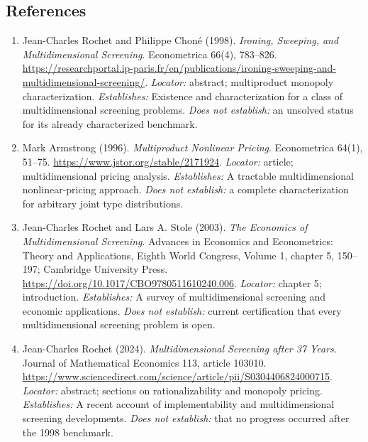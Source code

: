\documentclass[11pt,a4paper]{article}
\begin{document}
\subsection*{References}

\begin{enumerate}

\item[S1] Jean-Charles Rochet and Philippe Choné (1998). \emph{Ironing, Sweeping, and Multidimensional Screening}. Econometrica 66(4), 783--826. \url{https://researchportal.ip-paris.fr/en/publications/ironing-sweeping-and-multidimensional-screening/}. \textit{Locator:} abstract; multiproduct monopoly characterization. \textit{Establishes:} Existence and characterization for a class of multidimensional screening problems. \textit{Does not establish:} an unsolved status for its already characterized benchmark.

\item[S2] Mark Armstrong (1996). \emph{Multiproduct Nonlinear Pricing}. Econometrica 64(1), 51--75. \url{https://www.jstor.org/stable/2171924}. \textit{Locator:} article; multidimensional pricing analysis. \textit{Establishes:} A tractable multidimensional nonlinear-pricing approach. \textit{Does not establish:} a complete characterization for arbitrary joint type distributions.

\item[S3] Jean-Charles Rochet and Lars A. Stole (2003). \emph{The Economics of Multidimensional Screening}. Advances in Economics and Econometrics: Theory and Applications, Eighth World Congress, Volume 1, chapter 5, 150--197; Cambridge University Press. \url{https://doi.org/10.1017/CBO9780511610240.006}. \textit{Locator:} chapter 5; introduction. \textit{Establishes:} A survey of multidimensional screening and economic applications. \textit{Does not establish:} current certification that every multidimensional screening problem is open.

\item[S4] Jean-Charles Rochet (2024). \emph{Multidimensional Screening after 37 Years}. Journal of Mathematical Economics 113, article 103010. \url{https://www.sciencedirect.com/science/article/pii/S0304406824000715}. \textit{Locator:} abstract; sections on rationalizability and monopoly pricing. \textit{Establishes:} A recent account of implementability and multidimensional screening developments. \textit{Does not establish:} that no progress occurred after the 1998 benchmark.

\end{enumerate}
\end{document}
